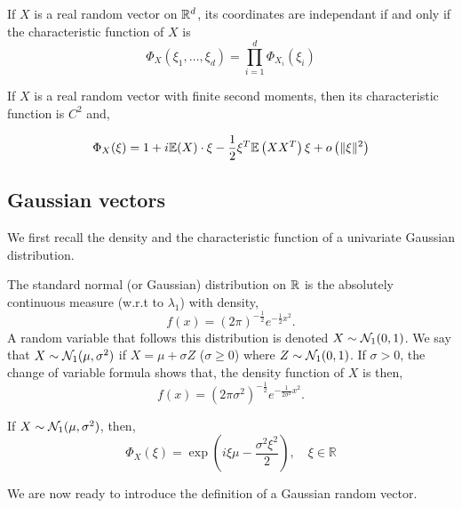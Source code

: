 \documentclass{article}
\begin{document}
\begin{prop}
  If $X$ is a real random vector on $\mathbb{R}^{d}$, its coordinates are independant if and only if
  the characteristic function of $X$ is
  $$
  \Phi_{X}\left(\xi_{1}, \ldots, \xi_{d}\right)=\prod_{i=1}^{d} \Phi_{X_{i}}\left(\xi_{i}\right)
  $$
\end{prop}

\begin{prop} \label{prop:charac}
  If $X$ is a real random vector with finite second moments, then its
  characteristic function is $C^2$ and,

  \begin{equation*}
    \Phi_{X}(\xi)=1 + i \mathbb{E}(X) \cdot \xi-\frac{1}{2} \xi^T \mathbb{E}\left(XX^T\right) \xi+o\left(\|\xi\|^{2}\right)
  \end{equation*}
  
\end{prop}


\subsection{Gaussian vectors}

We first recall the density and the characteristic function of a univariate
Gaussian distribution.

\begin{definition} The standard normal (or Gaussian) distribution on $\mathbb{R}$ is the
  absolutely continuous measure (w.r.t to $\lambda_1$) with density, $$f(x)=(2
  \pi)^{-\frac{1}{2}} e^{-\frac{1}{2}x^{2}}.$$
  A random variable that follows this distribution is denoted $X \sim
  \mathcal{N}_1(0,1)$. We say that $X \sim \mathcal{N}_1(\mu,\sigma^2)$ if $X = \mu + \sigma Z$
  ($\sigma \geq 0$) where  $Z \sim \mathcal{N}_1(0,1)$. If $\sigma >0$, the change of variable formula
  shows that, the density function of $X$ is then, $$f(x)=(2
  \pi\sigma^2)^{-\frac{1}{2}} e^{-\frac{1}{2\sigma^2}x^{2}}.$$
\end{definition}

\begin{prop} If $X \sim \mathcal{N}_1(\mu,\sigma^2)$, then, 
  $$
  \Phi_{X}(\xi)=\exp \left(i\xi \mu -\frac{\sigma^{2} \xi^{2}}{2}\right), \quad \xi \in \mathbb{R}
  $$
\end{prop}

We are now ready to introduce the definition of a Gaussian random vector. 
\end{document}
